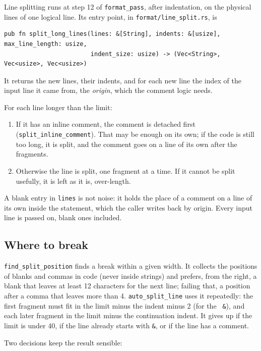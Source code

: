 \documentclass[11pt,a4paper,openany]{book}
\newcommand{\code}[1]{\texttt{\small #1}}
\newcommand{\file}[1]{\texttt{\small\color{accent}#1}}
\begin{document}
Line splitting runs at step 12 of \code{format\_pass}, after indentation, on the
physical lines of one logical line. Its entry point, in
\file{format/line\_split.rs}, is

\begin{lstlisting}[style=rust]
pub fn split_long_lines(lines: &[String], indents: &[usize], max_line_length: usize,
                        indent_size: usize) -> (Vec<String>, Vec<usize>, Vec<usize>)
\end{lstlisting}

It returns the new lines, their indents, and for each new line the index of
the input line it came from, the \emph{origin}, which the comment logic needs.

For each line longer than the limit:

\begin{enumerate}
  \item If it has an inline comment, the comment is detached first
    (\code{split\_inline\_comment}). That may be enough on its own; if the code is
    still too long, it is split, and the comment goes on a line of its own
    after the fragments.
  \item Otherwise the line is split, one fragment at a time. If it cannot be
    split usefully, it is left as it is, over-length.
\end{enumerate}

A blank entry in \code{lines} is not noise: it holds the place of a comment on
a line of its own inside the statement, which the caller writes back by
origin. Every input line is passed on, blank ones included.

\subsection{Where to break}

\code{find\_split\_position} finds a break within a given width. It collects
the positions of blanks and commas in code (never inside strings) and
prefers, from the right, a blank that leaves at least 12 characters for the
next line; failing that, a position after a comma that leaves more than 4.
\code{auto\_split\_line} uses it repeatedly: the first fragment must fit in
the limit minus the indent minus 2 (for the \code{ \&}), and each later
fragment in the limit minus the continuation indent. It gives up if the limit is
under 40, if the line already starts with \code{\&}, or if the line has a
comment.

Two decisions keep the result sensible:
\end{document}
